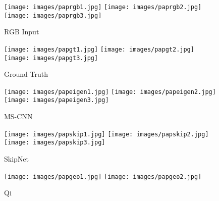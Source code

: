 \documentclass[5p]{elsarticle}
\begin{document}
\begin{figure*}[t!]
     \centering
     \begin{subfigure}[t]{0.13\textwidth}
         \centering
         \caption{RGB Input}
         \texttt{[image: images/paprgb1.jpg]}
         \hspace{1em}
         \texttt{[image: images/paprgb2.jpg]}
         \hspace{1em}
         \texttt{[image: images/paprgb3.jpg]}
         \label{subfig3:rgb}
     \end{subfigure}
         \begin{subfigure}[t]{0.13\textwidth}
         \centering
         \caption{Ground Truth}
         \texttt{[image: images/papgt1.jpg]}
         \hspace{1em}
         \texttt{[image: images/papgt2.jpg]}
         \hspace{1em}
         \texttt{[image: images/papgt3.jpg]}
         \label{subfig3:gt}
     \end{subfigure}
     \begin{subfigure}[t]{0.13\textwidth}
         \centering
         \caption{MS-CNN \cite{eigen2015predicting}}
         \texttt{[image: images/papeigen1.jpg]}
         \hspace{1em}
         \texttt{[image: images/papeigen2.jpg]}
         \hspace{1em}
         \texttt{[image: images/papeigen3.jpg]}
         \label{subfig3:mscnn}
     \end{subfigure}
          \begin{subfigure}[t]{0.13\textwidth}
         \centering
         \caption{SkipNet \cite{bansal2016marr}}
         \texttt{[image: images/papskip1.jpg]}
         \hspace{1em}
         \texttt{[image: images/papskip2.jpg]}
         \hspace{1em}
         \texttt{[image: images/papskip3.jpg]}
         \label{subfig3:skipnet}
     \end{subfigure}
         \begin{subfigure}[t]{0.13\textwidth}
         \centering
         \caption{Qi \etal \cite{qi2018geonet}}
         \texttt{[image: images/papgeo1.jpg]}
         \hspace{1em}
         \texttt{[image: images/papgeo2.jpg]}

\end{subfigure}
\end{figure*}
\end{document}
